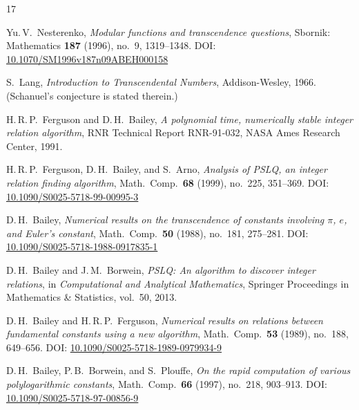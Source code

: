 \documentclass[11pt]{amsart}
\theoremstyle{remark}
\begin{document}

\begin{thebibliography}{17}

Yu.\,V.~Nesterenko,
\emph{Modular functions and transcendence questions},
Sbornik: Mathematics \textbf{187} (1996), no.~9, 1319--1348.
\newline DOI: \href{https://doi.org/10.1070/SM1996v187n09ABEH000158}%
{10.1070/SM1996v187n09ABEH000158}

S.~Lang,
\emph{Introduction to Transcendental Numbers},
Addison-Wesley, 1966.
(Schanuel's conjecture is stated therein.)

H.\,R.\,P.~Ferguson and D.\,H.~Bailey,
\emph{A polynomial time, numerically stable integer relation algorithm},
RNR Technical Report RNR-91-032, NASA Ames Research Center, 1991.

H.\,R.\,P.~Ferguson, D.\,H.~Bailey, and S.~Arno,
\emph{Analysis of PSLQ, an integer relation finding algorithm},
Math.\ Comp.\ \textbf{68} (1999), no.~225, 351--369.
\newline DOI: \href{https://doi.org/10.1090/S0025-5718-99-00995-3}%
{10.1090/S0025-5718-99-00995-3}

D.\,H.~Bailey,
\emph{Numerical results on the transcendence of constants involving $\pi$, $e$, and
Euler's constant},
Math.\ Comp.\ \textbf{50} (1988), no.~181, 275--281.
\newline DOI: \href{https://doi.org/10.1090/S0025-5718-1988-0917835-1}%
{10.1090/S0025-5718-1988-0917835-1}

D.\,H.~Bailey and J.\,M.~Borwein,
\emph{PSLQ: An algorithm to discover integer relations},
in \emph{Computational and Analytical Mathematics}, Springer Proceedings in
Mathematics \& Statistics, vol.~50, 2013.

D.\,H.~Bailey and H.\,R.\,P.~Ferguson,
\emph{Numerical results on relations between fundamental constants using a new
algorithm},
Math.\ Comp.\ \textbf{53} (1989), no.~188, 649--656.
\newline DOI: \href{https://doi.org/10.1090/S0025-5718-1989-0979934-9}%
{10.1090/S0025-5718-1989-0979934-9}

D.\,H.~Bailey, P.\,B.~Borwein, and S.~Plouffe,
\emph{On the rapid computation of various polylogarithmic constants},
Math.\ Comp.\ \textbf{66} (1997), no.~218, 903--913.
\newline DOI: \href{https://doi.org/10.1090/S0025-5718-97-00856-9}%
{10.1090/S0025-5718-97-00856-9}


\end{thebibliography}
\end{document}
